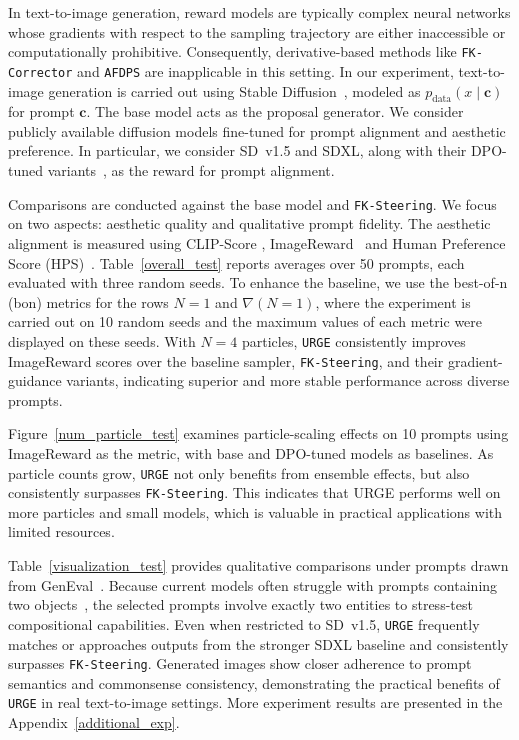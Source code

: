 \documentclass{article}
\newcommand{\mathbbm}[1]{\boldsymbol{#1}}
\theoremstyle{plain}
\theoremstyle{definition}
\theoremstyle{remark}
\begin{document}
In text-to-image generation, reward models are typically complex neural networks whose gradients with respect to the sampling trajectory are either inaccessible or computationally prohibitive. Consequently, derivative-based methods like \texttt{FK-Corrector} and \texttt{AFDPS} are inapplicable in this setting. In our experiment, text-to-image generation is carried out using Stable Diffusion~\cite{podell2023sdxl, rombach2022high}, modeled as \(p_{\mathrm{data}}(x\mid \mathbbm{c})\) for prompt \(\mathbbm{c}\). The base model acts as the proposal generator. We consider publicly available diffusion models fine-tuned for prompt alignment and aesthetic preference. In particular, we consider SD~v1.5 and SDXL, along with their DPO-tuned variants~\cite{wallace2024dpo, rafailov2023dpo}, as the reward for prompt alignment.

Comparisons are conducted against the base model and \texttt{FK-Steering}. We focus on two aspects: aesthetic quality and qualitative prompt fidelity. The aesthetic alignment is measured using CLIP-Score \cite{hessel2021clipscore}, ImageReward~\cite{Xu2023ImageReward} and Human Preference Score (HPS)~\cite{WuSunZhu2023_HPS}. Table~\ref{overall_test} reports averages over 50 prompts, each evaluated with three random seeds. To enhance the baseline, we use the best-of-n (bon) metrics for the rows $N=1$ and $\nabla (N=1)$, where the experiment is carried out on 10 random seeds and the maximum values of each metric were displayed on these seeds. With \(N=4\) particles, \texttt{URGE} consistently improves ImageReward scores over the baseline sampler, \texttt{FK-Steering}, and their gradient-guidance variants, indicating superior and more stable performance across diverse prompts.

Figure~\ref{num_particle_test} examines particle-scaling effects on 10 prompts using ImageReward as the metric, with base and DPO-tuned models as baselines.  As particle counts grow, \texttt{URGE} not only benefits from ensemble effects, but also consistently surpasses \texttt{FK-Steering}. This indicates that URGE performs well on more particles and small models, which is valuable in practical applications with limited resources.

Table~\ref{visualization_test} provides qualitative comparisons under prompts drawn from GenEval~\cite{Ghosh2023GenEval}. Because current models often struggle with prompts containing two objects~\cite{CaoGuoHuo2025_T2ICountBench}, the selected prompts involve exactly two entities to stress-test compositional capabilities. Even when restricted to SD~v1.5, \texttt{URGE} frequently matches or approaches outputs from the stronger SDXL baseline and consistently surpasses \texttt{FK-Steering}. Generated images show closer adherence to prompt semantics and commonsense consistency, demonstrating the practical benefits of \texttt{URGE} in real text-to-image settings. More experiment results are presented in the Appendix~\ref{additional_exp}.
\end{document}
